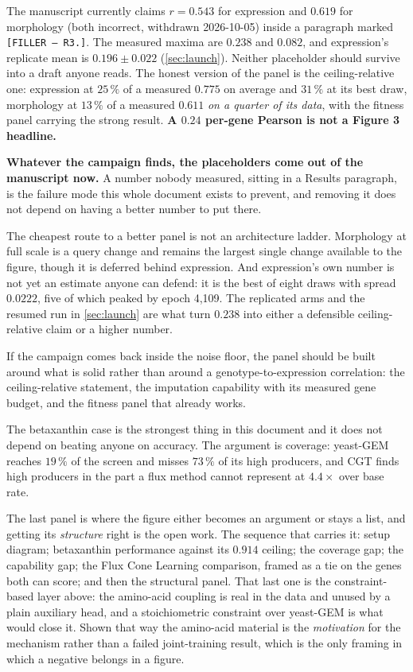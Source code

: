  The manuscript currently claims $r = 0.543$ for expression and $0.619$
for morphology (both incorrect, withdrawn 2026-10-05) inside a paragraph marked \texttt{[FILLER -- R3.]}. The measured maxima are
$0.238$ and $0.082$, and expression's replicate mean is $0.196 \pm 0.022$
(\cref{sec:launch}). Neither placeholder should survive into a draft anyone reads. The
honest version of the panel is the ceiling-relative one: expression at $25\,\%$ of a
measured $0.775$ on average and $31\,\%$ at its best draw, morphology at $13\,\%$ of a
measured $0.611$ \emph{on a quarter of its data}, with the fitness panel carrying the
strong result. \textbf{A $0.24$ per-gene Pearson
is not a Figure 3 headline.}

\textbf{Whatever the campaign finds, the placeholders come out of the manuscript now.} A
number nobody measured, sitting in a Results paragraph, is the failure mode this whole
document exists to prevent, and removing it does not depend on having a better number to put
there.

The cheapest route to a better panel is not an architecture ladder. Morphology at full scale
is a query change and remains the largest single change available to the figure, though it
is deferred behind expression. And expression's own number is not yet an estimate anyone
can defend: it is the best of eight draws with spread $0.0222$, five of which peaked by
epoch 4,109. The replicated arms and the resumed run in \cref{sec:launch} are what turn
$0.238$ into either a defensible ceiling-relative claim or a higher number.

If the campaign comes back inside the noise floor, the panel should be built around what is
solid rather than around a genotype-to-expression correlation: the ceiling-relative
statement, the imputation capability with its measured gene budget, and the fitness panel
that already works.

 The betaxanthin case is the strongest thing in this document and it does
not depend on beating anyone on accuracy. The argument is coverage: yeast-GEM reaches
$19\,\%$ of the screen and misses $73\,\%$ of its high producers, and CGT finds high
producers in the part a flux method cannot represent at $4.4\times$ over base rate.

The last panel is where the figure either becomes an argument or stays a list, and getting
its \emph{structure} right is the open work. The sequence that carries it: setup diagram;
betaxanthin performance against its $0.914$ ceiling; the coverage gap; the capability gap;
the Flux Cone Learning comparison, framed as a tie on the genes both can score; and then
the structural panel. That last one is the constraint-based layer above: the amino-acid
coupling is real in the data and unused by a plain auxiliary head, and a stoichiometric
constraint over yeast-GEM is what would close it. Shown that way the amino-acid material is
the \emph{motivation} for the mechanism rather than a failed joint-training result, which
is the only framing in which a negative belongs in a figure.

